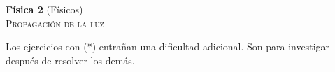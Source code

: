 \documentclass[11pt, spanish, a4paper, twoside]{article}
\begin{document}
\begin{center}
	\textbf{Física 2} (Físicos) \hfill {}\\
	\textsc{\LARGE Propagación de la luz}
\end{center}

Los ejercicios con (*) entrañan una dificultad adicional. Son para investigar después de resolver los demás.


\begin{enumerate}







\end{enumerate}
\end{document}
